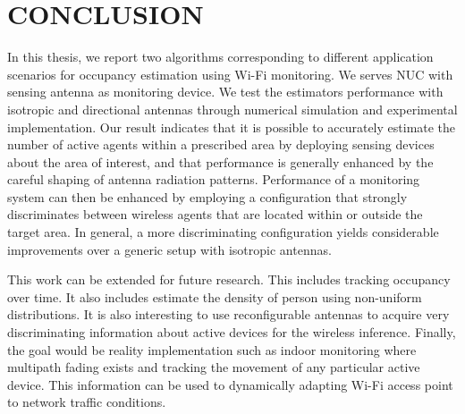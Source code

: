\chapter{CONCLUSION}
In this thesis, we report two algorithms corresponding to different application scenarios for occupancy estimation using Wi-Fi monitoring. We serves NUC with sensing antenna as monitoring device. We test the estimators performance with isotropic and directional antennas through numerical simulation and experimental implementation. Our result indicates that it is possible to accurately estimate the number of active agents within a prescribed area by deploying sensing devices about the area of interest, and that performance is generally enhanced by the careful shaping of antenna radiation patterns.
Performance of a monitoring system can then be enhanced by employing a configuration that strongly discriminates between wireless agents that are located within or outside the target area.
In general, a more discriminating configuration yields considerable improvements over a generic setup with isotropic antennas.

This work can be extended for future research. This includes tracking occupancy over time. It also includes estimate the density of person using non-uniform distributions. It is also interesting to use reconfigurable antennas to acquire very discriminating information about active devices for the wireless inference. Finally, the goal would be reality implementation such as indoor monitoring where multipath fading exists and tracking the movement of any particular active device. This information can be used to dynamically adapting Wi-Fi access point to network traffic conditions.
